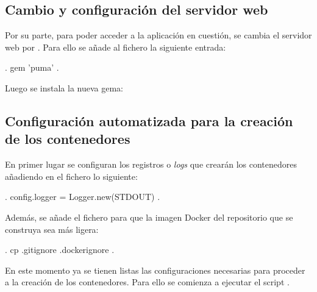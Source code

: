 \subsection{Cambio y configuración del servidor web}

Por su parte, para poder acceder a la aplicación en cuestión, se cambia el servidor web  por . Para ello se añade al fichero  la siguiente entrada:

\begin{codelisting}
\label{code:addpuma}
\begin{code}
.
gem 'puma'
.
\end{code}
\end{codelisting}

Luego se instala la nueva gema: 


\subsection{Configuración automatizada para la creación de los contenedores}

En primer lugar se configuran los registros o \textit{logs} que crearán los contenedores añadiendo en el fichero  lo siguiente:

\begin{codelisting}
\label{code:application.rb}
\begin{code}
.
config.logger = Logger.new(STDOUT)
.
\end{code}
\end{codelisting}

Además, se añade el fichero  para que la imagen Docker del repositorio que se construya sea más ligera:

\begin{codelisting}
\label{code:.dockerignore}
\begin{code}
.
cp .gitignore .dockerignore
.
\end{code}
\end{codelisting}

En este momento ya se tienen listas las configuraciones necesarias para proceder a la creación de los contenedores. Para ello se comienza a ejecutar el script .

